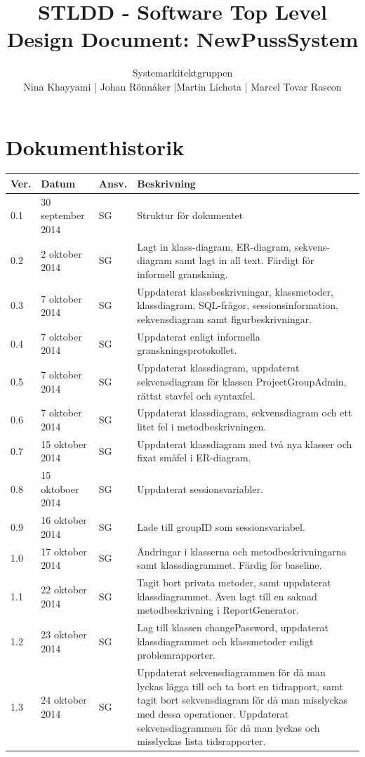 \documentclass[a4paper]{article}
\title{STLDD - Software Top Level Design Document: NewPussSystem}
\author{Systemarkitektgruppen \\ Nina Khayyami | Johan Rönnåker |Martin Lichota | Marcel Tovar Rascon}
\date{}
\begin{document}
\maketitle
\thispagestyle{fancy}
\tableofcontents
\newpage

\section*{Dokumenthistorik}

\begin{tabular}{ l l l p{8.5cm} }
Ver. & Datum & Ansv. & Beskrivning \\\hline
0.1 & 30 september 2014 & SG & Struktur för dokumentet\\
0.2 & 2 oktober 2014 & SG & Lagt in klass-diagram, ER-diagram, sekvens-diagram samt lagt in all text. Färdigt för informell granskning.\\
0.3 & 7 oktober 2014 & SG & Uppdaterat klassbeskrivningar, klassmetoder, klassdiagram, SQL-frågor, sessionsinformation, sekvensdiagram samt figurbeskrivningar.\\
0.4 & 7 oktober 2014 & SG & Uppdaterat enligt informella granskningsprotokollet.\\
0.5 & 7 oktober 2014 & SG & Uppdaterat klassdiagram, uppdaterat sekvensdiagram för klassen ProjectGroupAdmin, rättat stavfel och syntaxfel.\\
0.6 & 7 oktober 2014 & SG & Uppdaterat klassdiagram, sekvensdiagram och ett litet fel i metodbeskrivningen.\\
0.7 & 15 oktober 2014 & SG & Uppdaterat klassdiagram med två nya klasser och fixat småfel i ER-diagram.\\
0.8 & 15 oktoboer 2014 & SG & Uppdaterat sessionsvariabler.\\
0.9 & 16 oktober 2014 & SG & Lade till groupID som sessionsvariabel.\\
1.0 & 17 oktober 2014 & SG & Ändringar i klasserna och metodbeskrivningarna samt klassdiagrammet. Färdig för baseline.\\
1.1 & 22 oktober 2014 & SG & Tagit bort privata metoder, samt uppdaterat klassdiagrammet. Även lagt till en saknad metodbeskrivning i ReportGenerator.\\
1.2 & 23 oktober 2014 & SG & Lag till klassen changePassword, uppdaterat klassdiagrammet och klassmetoder enligt problemrapporter. \\
1.3 & 24 oktober 2014 & SG & Uppdaterat sekvensdiagrammen för då man lyckas lägga till och ta bort en tidrapport, samt tagit bort sekvensdiagram för då man misslyckas med dessa operationer. Uppdaterat sekvensdiagrammen för då man lyckas och misslyckas lista tidsrapporter. 

\end{tabular}
\newpage
\end{document}
